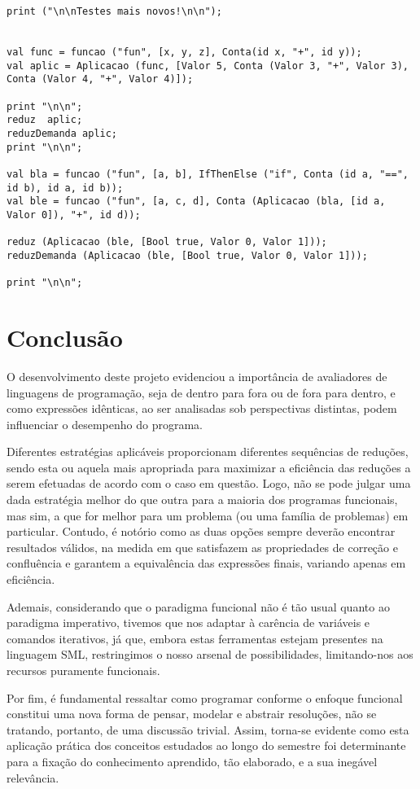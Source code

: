 \documentclass[brazil,times]{abnt}
\begin{document}
\begin{lstlisting}
print ("\n\nTestes mais novos!\n\n");


val func = funcao ("fun", [x, y, z], Conta(id x, "+", id y));
val aplic = Aplicacao (func, [Valor 5, Conta (Valor 3, "+", Valor 3), Conta (Valor 4, "+", Valor 4)]);

print "\n\n";
reduz  aplic;
reduzDemanda aplic;
print "\n\n";

val bla = funcao ("fun", [a, b], IfThenElse ("if", Conta (id a, "==", id b), id a, id b));
val ble = funcao ("fun", [a, c, d], Conta (Aplicacao (bla, [id a, Valor 0]), "+", id d));

reduz (Aplicacao (ble, [Bool true, Valor 0, Valor 1]));
reduzDemanda (Aplicacao (ble, [Bool true, Valor 0, Valor 1]));

print "\n\n";
\end{lstlisting}

\chapter*{Conclusão}
O desenvolvimento deste projeto evidenciou a importância de avaliadores de linguagens de programação, seja de dentro para fora ou de fora para dentro, e como expressões idênticas, ao ser analisadas sob perspectivas distintas, podem influenciar o
desempenho do programa.

Diferentes estratégias aplicáveis proporcionam diferentes sequências de reduções, sendo esta ou aquela mais apropriada para maximizar a eficiência das reduções a serem efetuadas de acordo com o caso em questão. Logo, não se pode julgar uma dada estratégia melhor do que outra para a maioria dos programas funcionais, mas sim, a que for melhor para um problema (ou uma família de problemas) em particular. Contudo, é notório como as duas opções sempre deverão encontrar resultados válidos, na medida em que satisfazem as propriedades de correção e confluência e garantem a equivalência das expressões finais, variando apenas em eficiência.

Ademais, considerando que o paradigma funcional não é tão usual quanto ao paradigma imperativo, tivemos que nos adaptar à carência de variáveis e comandos iterativos, já que, embora estas ferramentas estejam presentes na linguagem SML, restringimos o nosso arsenal de possibilidades, limitando-nos aos recursos puramente funcionais.

Por fim, é fundamental ressaltar como programar conforme o enfoque funcional constitui uma nova forma de pensar, modelar e abstrair resoluções, não se tratando, portanto, de uma discussão trivial. Assim, torna-se evidente como esta aplicação prática dos conceitos estudados ao longo do semestre foi determinante para a fixação do conhecimento aprendido, tão elaborado, e a sua inegável relevância.

\nocite{*}


\end{document}
